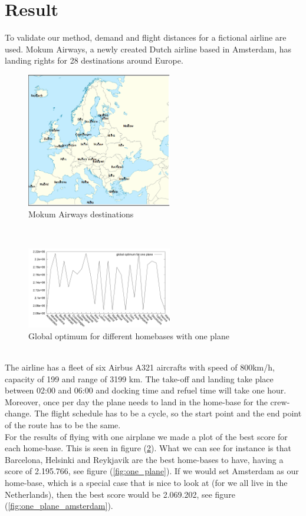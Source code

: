 \documentclass[journal]{IEEEtran}
\begin{document}
\section{Result}
To validate our method, demand and flight distances for a fictional airline are used. Mokum Airways, a newly created Dutch airline based in Amsterdam, has landing rights for 28 destinations around Europe.\\
\begin{figure}[!h]
\centering
\includegraphics[width=2.5in]{europe}
\caption{Mokum Airways destinations}
\label{fig:europe}
\end{figure}
\\
\begin{figure}[!h]
\centering
\includegraphics[width=2.5in]{different_homebases_one_plane}
\caption{Global optimum for different homebases with one plane}
\label{fig:different_homebase_one_plane}
\end{figure}
\\
The airline has a fleet of six Airbus A321 aircrafts with speed of 800km/h, capacity of 199 and range of 3199 km.  The take-off and landing take place between 02:00 and 06:00 and docking time and refuel time will take one hour. Moreover, once per day the plane needs to land in the home-base for the crew-change. The flight schedule has to be a cycle, so the start point and the end point of the route has to be the same. \\
For the results of flying with one airplane we made a plot of the best score for each home-base. This is seen in figure (\ref{fig:different_homebase_one_plane}). What we can see for instance is that Barcelona, Helsinki and Reykjavik are the best home-bases to have, having a score of 2.195.766, see figure (\ref{fig:one_plane}). If we would set Amsterdam as our home-base, which is a special case that is nice to look at (for we all live in the Netherlands), then the best score would be 2.069.202, see figure (\ref{fig:one_plane_amsterdam}).
\end{document}
